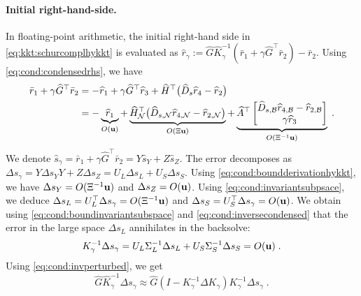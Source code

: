 \paragraph{Initial right-hand-side.}
In floating-point arithmetic, the initial right-hand side in \eqref{eq:kkt:schurcomplhykkt}
is evaluated as
$\widehat{r}_\gamma :=\widehat{G} \widehat{K}_\gamma^{-1} (\bar{r}_1 + \gamma \widehat{G}^\top \bar{r}_2) - \bar{r}_2$. Using \eqref{eq:cond:condensedrhs}, we have
\begin{equation}
  \label{eq:cond:boundderivationhykkt}
  \begin{aligned}
  \bar{r}_1 + \gamma \widehat{G}^\top \bar{r}_2 &=
- \widehat{r}_1 + \gamma \widehat{G}^\top \widehat{r}_3+ \widehat{H}^\top\big(\widehat{D}_{s} \widehat{r}_{4} - \widehat{r}_{2} \big) \\
&=  -
\underbrace{\widehat{r}_1}_{O(\mathbf{u})} +
\underbrace{
\widehat{H}_{\mathcal{N}}^\top\big(\widehat{D}_{s,\mathcal{N}} \widehat{r}_{4,\mathcal{N}} - \widehat{r}_{2,\mathcal{N}} \big)}_{O(\Xi \mathbf{u})}
+ \underbrace{\widehat{A}^\top \begin{bmatrix}
  \widehat{D}_{s,\mathcal{B}} \widehat{r}_{4,\mathcal{B}} - \widehat{r}_{2,\mathcal{B}}  \\
  \gamma \widehat{r}_3
\end{bmatrix}}_{O(\Xi^{-1}\mathbf{u})} \; .
  \end{aligned}
\end{equation}
We denote $\widehat{s}_\gamma = \bar{r}_1 + \gamma \widehat{G}^\top \bar{r}_2 =
Y \widehat{s}_Y + Z \widehat{s}_Z$.
The error decomposes as $\Delta s_\gamma = Y \Delta s_Y Y + Z \Delta s_Z
= U_L \Delta s_L + U_S \Delta s_S$.
Using \eqref{eq:cond:boundderivationhykkt},
we have $\Delta s_Y = O(\Xi^{-1} \mathbf{u})$ and $\Delta s_Z = O(\mathbf{u})$.
Using \eqref{eq:cond:invariantsubpsace}, we deduce
$\Delta s_L = U_L^\top \Delta s_\gamma = O(\Xi^{-1} \mathbf{u})$ and
$\Delta s_S = U_S^\top \Delta s_\gamma = O(\mathbf{u})$.
We obtain using \eqref{eq:cond:boundinvariantsubspace} and \eqref{eq:cond:inversecondensed}
that the error in the large space $\Delta s_L$ annihilates in the backsolve:
\begin{equation}
  \label{eq:cond:boundhykkt1}
  K_\gamma^{-1} \Delta s_\gamma = U_L \Sigma_L^{-1} \Delta s_L + U_S \Sigma_S^{-1} \Delta s_S  = O(\mathbf{u})
  \; .
\end{equation}
Using \eqref{eq:cond:invperturbed}, we get
\begin{equation}
  \widehat{G} \widehat{K}_\gamma^{-1} \Delta s_\gamma \approx
  \widehat{G} (I - K_\gamma^{-1}\Delta K_\gamma) K_\gamma^{-1} \Delta s_\gamma \; .
\end{equation}
